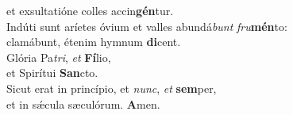 \oddverse et exsultatióne colles accin\textbf{gén}tur.\\
\evenverse Indúti sunt aríetes óvium et valles abundá\textit{bunt} \textit{fru}\textbf{mén}to:~\*\\
\evenverse clamábunt, étenim hymnum \textbf{di}cent.\\
\oddverse Glória Pa\textit{tri}, \textit{et} \textbf{Fí}lio,~\*\\
\oddverse et Spirítui \textbf{San}cto.\\
\evenverse Sicut erat in princípio, et \textit{nunc}, \textit{et} \textbf{sem}per,~\*\\
\evenverse et in sǽcula sæculórum. \textbf{A}men.\\
